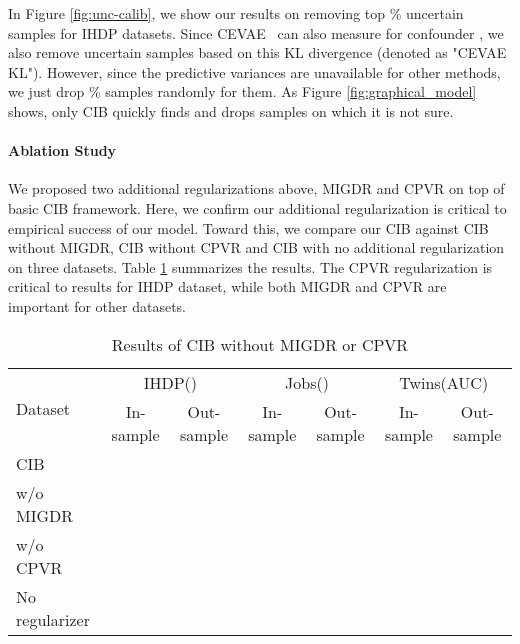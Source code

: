 \documentclass{article}
\begin{document}
    In Figure \ref{fig:unc-calib}, we show our results on removing top \% uncertain samples for IHDP datasets. Since CEVAE~\cite{Louizos17} can also measure  for confounder , we also remove uncertain samples based on this KL divergence (denoted as "CEVAE KL"). However, since the predictive variances are unavailable for other methods, we just drop \% samples randomly for them. As Figure \ref{fig:graphical_model} shows, only CIB quickly finds and drops samples on which it is not sure.
    
    
    


    \vspace{.2cm}
    \paragraph{Ablation Study} 
    We proposed two additional regularizations above, MIGDR and CPVR on top of basic CIB framework. Here, we confirm our additional regularization is critical to empirical success of our model. Toward this, we compare our CIB against CIB without MIGDR, CIB without CPVR and CIB with no additional regularization on three datasets. Table \ref{ablation-study} summarizes the results. The CPVR regularization is critical to results for IHDP dataset, while both MIGDR and CPVR are important for other datasets.







\setlength{\textfloatsep}{0.5cm}
\begin{table}[t]
  \centering
  \caption{Results of CIB without MIGDR or CPVR}
  \label{ablation-study}
  {\scriptsize\begin{tabular}{lcccccc}
    \toprule
    \multirow{2}{*}{Dataset} & \multicolumn{2}{c}{IHDP()} & \multicolumn{2}{c}{Jobs()} & \multicolumn{2}{c}{Twins(AUC)} \\
    & In-sample & Out-sample & In-sample & Out-sample & In-sample & Out-sample \\
    \midrule
    CIB &  &  &  &  &  &  \\
    \midrule
    w/o MIGDR &  &  &  &  &  &  \\
    w/o CPVR &  &  &  &  &  &  \\
    No regularizer &  &  &  &  &  &  \\
    \bottomrule
  \end{tabular}}
\end{table}
\end{document}
